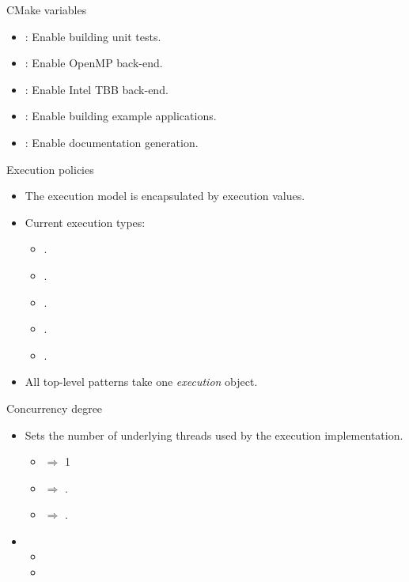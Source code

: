 \begin{frame}[t]{CMake variables}
\begin{itemize}
  \item {}: Enable building unit tests.
  \item {}: Enable OpenMP back-end.
  \item {}: Enable Intel TBB back-end.
  \item {}: Enable building example applications.
  \item {}: Enable documentation generation.
\end{itemize}
\end{frame}

\begin{frame}[t]{Execution policies}
\begin{itemize}
  \item The execution model is encapsulated by execution values.
  \vfill
  \item Current execution types:
    \begin{itemize}
      \item {}.
      \item {}.
      \item {}.
      \item {}.
      \item {}.
    \end{itemize}
  \vfill
  \item All top-level patterns take one \emph{execution} object.
\end{itemize}
\end{frame}

\begin{frame}[t]{Concurrency degree}
\begin{itemize}
  \item Sets the number of underlying threads used by the execution implementation.
    \begin{itemize}
      \item {} $\Rightarrow$ 1
      \item {} $\Rightarrow$ .
      \item {} $\Rightarrow$ .
    \end{itemize}

  \vfill
  \item {}
    \begin{itemize}
      \item {}
      \item {}
    \end{itemize}
\end{itemize}
\end{frame}

